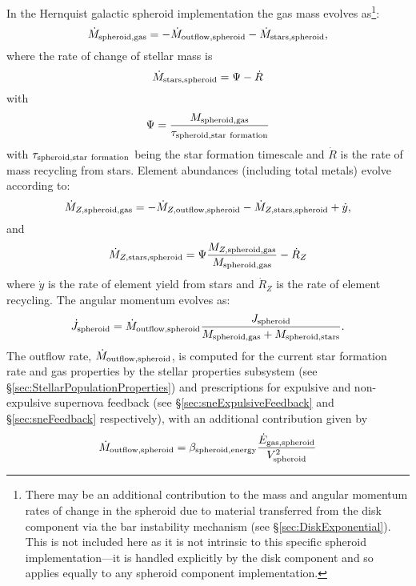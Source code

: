 In the Hernquist galactic spheroid implementation the gas mass evolves as\footnote{There may be an additional contribution to the mass and angular momentum rates of change in the spheroid due to material transferred from the disk \gls{component} via the bar instability mechanism (see \S\protect\ref{sec:DiskExponential}). This is not included here as it is not intrinsic to this specific spheroid implementation---it is handled explicitly by the disk \gls{component} and so applies equally to any spheroid \gls{component} implementation.}:
\begin{equation}
 \dot{M}_{\rm spheroid, gas} = - \dot{M}_{\rm outflow, spheroid} - \dot{M}_{\rm stars, spheroid},
\end{equation}
where the rate of change of stellar mass is
\begin{equation}
 \dot{M}_{\rm stars, spheroid} = \Psi - \dot{R}
\end{equation}
with
\begin{equation}
 \Psi = {M_{\rm spheroid, gas} \over \tau_{\rm spheroid, star~formation}}
\end{equation}
with $\tau_{\rm spheroid, star~formation}$ being the star formation timescale and $\dot{R}$ is the rate of mass recycling from stars.
Element abundances (including total metals) evolve according to:
\begin{equation}
  \dot{M}_{Z, {\rm spheroid, gas}} = - \dot{M}_{Z, {\rm outflow, spheroid}} - \dot{M}_{Z, {\rm stars, spheroid}} + \dot{y},
\end{equation}
and
\begin{equation}
 \dot{M}_{Z, {\rm stars, spheroid}} = \Psi {M_{Z, {\rm spheroid, gas}} \over M_{\rm spheroid, gas}} - \dot{R}_Z
\end{equation}
where $\dot{y}$ is the rate of element yield from stars and $\dot{R}_Z$ is the rate of element recycling. The angular momentum evolves as:
\begin{equation}
 \dot{J}_{\rm spheroid} = \dot{M}_{\rm outflow, spheroid} {J_{\rm spheroid} \over M_{\rm spheroid, gas} + M_{\rm spheroid, stars}}.
\end{equation}
The outflow rate, $\dot{M}_{\rm outflow, spheroid}$, is computed for the current star formation rate and gas properties by the stellar properties subsystem (see \S\ref{sec:StellarPopulationProperties}) and prescriptions for expulsive and non-expulsive supernova feedback (see \S\ref{sec:sneExpulsiveFeedback} and \S\ref{sec:sneFeedback} respectively), with an additional contribution given by
\begin{equation}
 \dot{M}_{\rm outflow, spheroid} = \beta_{\rm spheroid, energy} {\dot{E}_{\rm gas, spheroid} \over V_{\rm spheroid}^2}
\end{equation}

